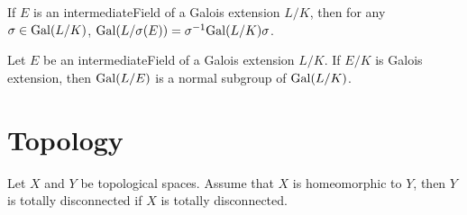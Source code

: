 \begin{theorem}
	If $E$ is an intermediateField of a Galois extension $L / K$, then for any $ \sigma \in \mathrm{Gal}(L / K) $, $ \mathrm{Gal}(L / \sigma(E)) = \sigma^{-1}\mathrm{Gal}(L / K)\sigma $.
\end{theorem}

\begin{theorem}
	Let $E$ be an intermediateField of a Galois extension $L / K$. If $ E / K $ is  
	Galois extension, then $ \mathrm{Gal}(L / E) $ is a normal subgroup of $ \mathrm{Gal}(L / K) $.
\end{theorem}

\section{Topology}

\begin{lemma}
	Let $ X $ and $ Y $ be topological spaces. Assume that $ X $ is homeomorphic to $ Y $, then $ Y $ is totally disconnected if $ X $ is totally disconnected.
\end{lemma}














